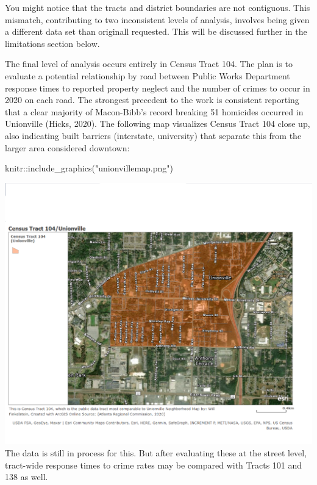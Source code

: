\documentclass[
]{article}
\newenvironment{Shaded}{\begin{snugshade}}{\end{snugshade}}
\newcommand{\FunctionTok}[1]{\textcolor[rgb]{0.00,0.00,0.00}{#1}}
\newcommand{\NormalTok}[1]{#1}
\newcommand{\SpecialCharTok}[1]{\textcolor[rgb]{0.00,0.00,0.00}{#1}}
\newcommand{\StringTok}[1]{\textcolor[rgb]{0.31,0.60,0.02}{#1}}
\begin{document}
You might notice that the tracts and district boundaries are not
contiguous. This mismatch, contributing to two inconsistent levels of
analysis, involves being given a different data set than originall
requested. This will be discussed further in the limitations section
below.

The final level of analysis occurs entirely in Census Tract 104. The
plan is to evaluate a potential relationship by road between Public
Works Department response times to reported property neglect and the
number of crimes to occur in 2020 on each road. The strongest precedent
to the work is consistent reporting that a clear majority of
Macon-Bibb's record breaking 51 homicides occurred in Unionville (Hicks,
2020). The following map visualizes Census Tract 104 close up, also
indicating built barriers (interstate, university) that separate this
from the larger area considered downtown:

\begin{Shaded}
\begin{Highlighting}[]
\NormalTok{knitr}\SpecialCharTok{::}\FunctionTok{include\_graphics}\NormalTok{(}\StringTok{"unionvillemap.png"}\NormalTok{)}
\end{Highlighting}
\end{Shaded}

\includegraphics{unionvillemap.png} The data is still in process for
this. But after evaluating these at the street level, tract-wide
response times to crime rates may be compared with Tracts 101 and 138 as
well.
\end{document}
